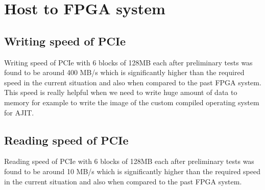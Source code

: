 \section*{Host to FPGA system}

\subsection*{Writing speed of PCIe}
Writing speed of PCIe with 6 blocks of 128MB each after preliminary tests was found to be around 400 MB/s which is significantly higher than
the required speed in the current situation and also when compared to the past FPGA system. This speed is really helpful when we need to
write huge amount of data to memory for example to write the image of the custom compiled operating system for AJIT.

\subsection*{Reading speed of PCIe}

Reading speed of PCIe with 6 blocks of 128MB each after preliminary tests was found to be around 10 MB/s which is significantly higher than
the required speed in the current situation and also when compared to the past FPGA system. 
